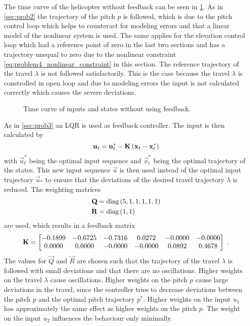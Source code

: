 The time curve of the helicopter without feedback can be seen in \cref{fig:problem4plots_without_feedback}. As in \cref{sec:prob2} the trajectory of the pitch $p$ is followed, which is due to the pitch control loop which helps to counteract for modeling errors and that a linear model of the nonlinear system is used. The same applies for the elevation control loop which had a reference point of zero in the last two sections and has a trajectory unequal to zero due to the nonlinear constraint \eqref{eq:problem4_nonlinear_constraint} in this section. The reference trajectory of the travel $\lambda$ is not followed satisfactorily. This is the case because the travel $\lambda$ is constrolled in open loop and due to modeling errors the input is not calculated correctly which causes the severe deviations.
\begin{figure}[htbp]
	\centering
	\caption{Time curve of inputs and states without using feedback.}
	\label{fig:problem4plots_without_feedback}%
\end{figure}

As in \cref{sec:prob3} an LQR is used as feedback controller. The input is then calculated by
\begin{equation}
\mathbf{u}_t=\mathbf{u}_t^*-\mathbf{K}\left(\mathbf{x}_t-\mathbf{x}_t^*\right)
\end{equation}
with $\vec{u}_t^*$ being the optimal input sequence and $\vec{x}_t^*$ being the optimal trajectory of the states. This new input sequence $\vec{u}$ is then used instead of the optimal input trajectory $\vec{u}_*$ to ensure that the deviations of the desired travel trajectory $\lambda$ is reduced. The weighting matrices 
\begin{subequations}
	\begin{align}
	\mathbf{Q}&=\mathrm{diag}\left(5,1,1,1,1,1\right)\\
	\mathbf{R}&=\mathrm{diag}\left(1,1\right)
	\end{align}
\end{subequations}
are used, which results in a feedback matrix
\begin{equation}
\vec{K}=\begin{bmatrix}
-0.1899  & -0.6725  & -0.7316  &  0.0272  & -0.0000  & -0.0000\\
0.0000   & 0.0000   & -0.0000  & -0.0000  & 0.0892   & 0.4678
\label{eq:problem4_lqr}%
\end{bmatrix}\FullStop
\end{equation}
The values for $\vec{Q}$ and $\vec{R}$ are chosen such that the trajectory of the travel $\lambda$ is followed with small deviations and that there are no oscillations. Higher weights on the travel $\lambda$ cause oscillations. Higher weights on the pitch $p$ cause large deviations in the travel, since the controller tries to decrease deviations between the pitch $p$ and the optimal pitch trajectory $p^*$. Higher weights on the input $u_1$ has approximately the same effect as higher weights on the pitch $p$. The weight on the input $u_2$ influences the behaviour only minimally.

